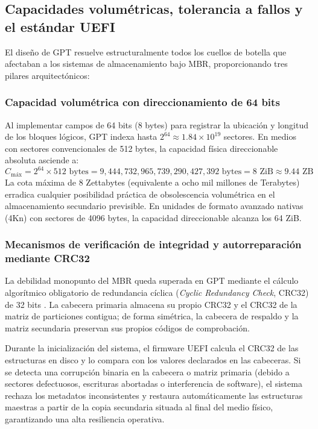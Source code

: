\documentclass[12pt]{article}
\begin{document}
\subsection{Capacidades volumétricas, tolerancia a fallos y el estándar UEFI}
\label{subsec:capacidadesUefiGpt}

El diseño de GPT resuelve estructuralmente todos los cuellos de botella que afectaban a los sistemas de almacenamiento bajo MBR, proporcionando tres pilares arquitectónicos:

\subsubsection{Capacidad volumétrica con direccionamiento de 64 bits}

Al implementar campos de 64 bits (8 bytes) para registrar la ubicación y longitud de los bloques lógicos, GPT indexa hasta $2^{64} \approx 1.84 \times 10^{19}$ sectores. En medios con sectores convencionales de 512 bytes, la capacidad física direccionable absoluta asciende a:
\begin{equation}
    C_{\text{máx}} = 2^{64} \times 512\text{ bytes} = 9{,}444{,}732{,}965{,}739{,}290{,}427{,}392\text{ bytes} = 8\text{ ZiB} \approx 9.44\text{ ZB}
\end{equation}
La cota máxima de 8 Zettabytes (equivalente a ocho mil millones de Terabytes) erradica cualquier posibilidad práctica de obsolescencia volumétrica en el almacenamiento secundario previsible. En unidades de formato avanzado nativas (4Kn) con sectores de 4096 bytes, la capacidad direccionable alcanza los 64 ZiB.

\subsubsection{Mecanismos de verificación de integridad y autorreparación mediante CRC32}

La debilidad monopunto del MBR queda superada en GPT mediante el cálculo algorítmico obligatorio de redundancia cíclica (\textit{Cyclic Redundancy Check}, CRC32) de 32 bits \parencite[\S 5.3.1, p.\ 114]{uefi2024specification}. La cabecera primaria almacena su propio CRC32 y el CRC32 de la matriz de particiones contigua; de forma simétrica, la cabecera de respaldo y la matriz secundaria preservan sus propios códigos de comprobación.

Durante la inicialización del sistema, el firmware UEFI calcula el CRC32 de las estructuras en disco y lo compara con los valores declarados en las cabeceras. Si se detecta una corrupción binaria en la cabecera o matriz primaria (debido a sectores defectuosos, escrituras abortadas o interferencia de software), el sistema rechaza los metadatos inconsistentes y restaura automáticamente las estructuras maestras a partir de la copia secundaria situada al final del medio físico, garantizando una alta resiliencia operativa.
\end{document}
